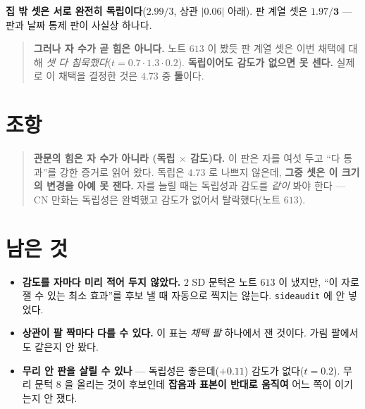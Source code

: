 \documentclass[11pt]{article}
\begin{document}
\textbf{집 밖 셋은 서로 완전히 독립이다}($2.99/3$, 상관 $|0.06|$ 아래).
판 계열 셋은 $\mathbf{1.97/3}$ --- 판과 날짜 통제 판이 사실상 하나다.

\begin{quote}
\textbf{그러나 자 수가 곧 힘은 아니다.} 노트 $613$ 이 봤듯 판 계열 셋은
이번 채택에 대해 \emph{셋 다 침묵했다}($t{=}0.7 \cdot 1.3 \cdot 0.2$).
\textbf{독립이어도 감도가 없으면 못 센다.} 실제로 이 채택을 결정한 것은
$4.73$ 중 \textbf{둘}이다.
\end{quote}

\section*{조항}

\begin{quote}
\textbf{관문의 힘은 자 수가 아니라 (독립 $\times$ 감도)다.} 이 판은 자를
여섯 두고 ``다 통과''를 강한 증거로 읽어 왔다. 독립은 $4.73$ 로 나쁘지
않은데, \textbf{그중 셋은 이 크기의 변경을 아예 못 잰다.} 자를 늘릴 때는
독립성과 감도를 \emph{같이} 봐야 한다 --- CN 만화는 독립성은 완벽했고
감도가 없어서 탈락했다(노트 $613$).
\end{quote}

\section*{남은 것}

\begin{itemize}
\item \textbf{감도를 자마다 미리 적어 두지 않았다.} $2$ SD 문턱은
노트 $613$ 이 냈지만, ``이 자로 잴 수 있는 최소 효과''를 후보 낼 때
자동으로 찍지는 않는다. \texttt{sideaudit} 에 안 넣었다.
\item \textbf{상관이 팔 짝마다 다를 수 있다.} 이 표는 \emph{채택 팔}
하나에서 잰 것이다. 가림 팔에서도 같은지 안 봤다.
\item \textbf{무리 안 판을 살릴 수 있나} --- 독립성은 좋은데($+0.11$)
감도가 없다($t{=}0.2$). 무리 문턱 $8$ 을 올리는 것이 후보인데
\textbf{잡음과 표본이 반대로 움직여} 어느 쪽이 이기는지 안 쟀다.
\end{itemize}
\end{document}
